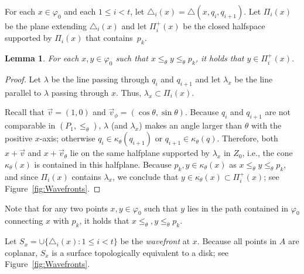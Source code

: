 \documentclass[a4paper, 11pt]{article}
\newtheorem{lemma}[theorem]{Lemma}
\newcommand{\ve}{{\ensuremath{\vec{v}}}}
\newcommand{\we}{{\ensuremath{\theta}}}
\newcommand{\cone}[1]{\ensuremath{\kappa_{\we}(#1)}}
\newcommand{\lt}{\ensuremath{ \leq_{\theta}}}
\begin{document}
For each $x\in \varphi_0$ and each $1\leq i < t$, let $\triangle_i(x) = \triangle(x, q_i, q_{i+1})$.
Let $\Pi_i(x)$ be the plane extending $\triangle_i(x)$ and let $\Pi^+_i(x)$ be the closed halfspace supported by $\Pi_i(x)$ that contains~$p_k$.

\begin{lemma}\label{lemma:Same side of plane}
For each $x,y\in \varphi_0$ such that $x\lt y\lt p_k$, it holds that $y\in \Pi_i^+(x)$. 
\end{lemma}
\begin{proof}
Let $\lambda$ be the line passing through $q_i$ and $q_{i+1}$ and let $\lambda_x$ be the line parallel to $\lambda$ passing through $x$. Thus, $\lambda_x\subset \Pi_i(x)$.

Recall that $\ve = (1,0)$ and $\ve_\phi =(\cos\we, \sin\we)$.
Because $q_i$ and $q_{i+1}$ are not comparable in $(P_1, \lt)$, $\lambda$ (and $\lambda_x$) makes an angle larger than $\theta$ with the positive $x$-axis; otherwise $q_i\in \cone{q_{i+1}}$ or $q_{i+1}\in \cone{q}$.
Therefore, both $x+\ve$ and $x+\ve_\we$ lie on the same halfplane supported by $\lambda_x$ in $Z_0$, i.e., the cone $\cone{x}$ is contained in this halfplane. 
Because $p_k, y\in \cone{x}$ as $x\lt y\lt p_k$, and since $\Pi_i(x)$ contains $\lambda_x$, 
we conclude that $y\in \cone{x}\subset \Pi^+_i(x)$; see Figure~\ref{fig:Wavefronts}.
\end{proof}

Note that for any two points $x,y\in \varphi_0$ such that $y$ lies in the path contained in $\varphi_0$ connecting $x$ with $p_k$,
it holds that $x\lt, y\lt p_k$.

Let $S_x = \cup\{\triangle_i(x) : 1\leq i< t\}$ be the \emph{wavefront} at $x$.
Because all points in $A$ are coplanar, $S_x$ is a surface topologically equivalent to a disk; see Figure~\ref{fig:Wavefronts}.
\end{document}
